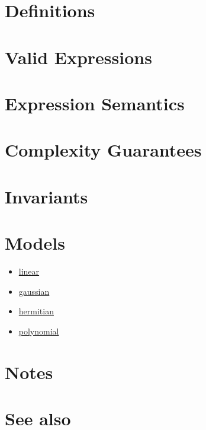 \documentclass{article}
\begin{document}
\section*{Definitions}
\section*{Valid Expressions}
\section*{Expression Semantics}
\section*{Complexity Guarantees}
\section*{Invariants}
\section*{Models}

\begin{itemize}
\item \href{\kmlroot/reference/linear.html}{linear}
\item \href{\kmlroot/reference/gaussian.html}{gaussian}
\item \href{\kmlroot/reference/hermitian.html}{hermitian}
\item \href{\kmlroot/reference/polynomial.html}{polynomial}
\end{itemize}

\section*{Notes}
\section*{See also}




\end{document}
